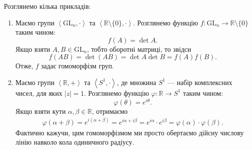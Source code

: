 \documentclass{math_library}
\begin{document}
\begin{example}
Розглянемо кілька прикладів:
\begin{enumerate}[nosep, wide=0pt,label={\arabic*)}]
\item Маємо групи $\left<\mathrm{GL}_n,\cdot \right>$ та $\left<\mathbb{R} \setminus \{0\}, \cdot \right>$. Розглянемо функцію $f \colon \mathrm{GL}_n \to \mathbb{R} \setminus \{0\}$ таким чином:
\[ f(A) = \det A.\]
Якщо взяти $A,B \in \mathrm{GL}_n$, тобто оборотні матриці, то звідси
\[ 
f(AB) = \det (AB) = \det A \det B = f(A) f(B). 
\]
Отже, $f$ задає гомоморфізм груп.

\item Маємо групи $\left<\mathbb{R},+ \right>$ та $\left<S^1, \cdot \right>$, де множина $S^1$ --- набір комплексних чисел, для яких $|z| = 1$. Розглянемо функцію $\varphi \colon \mathbb{R} \to S^1$ таким чином:
\[ 
\varphi(\theta) = e^{i \theta}. 
\]
Якщо взяти кути $\alpha,\beta \in \mathbb{R}$, отримаємо
\begin{align*}
\varphi(\alpha+\beta) = e^{i (\alpha+\beta)} = e^{i \alpha + i \beta} = e^{i\alpha} \cdot e^{i \beta} = \varphi(\alpha) \cdot \varphi(\beta).
\end{align*}
Фактично кажучи, цим гомоморфізмом ми просто обертаємо дійсну числову лінію навколо кола одиничного радіусу.
\begin{figure}[H]
\centering
{}
\qquad
{}
\end{figure}
\end{enumerate}
\end{example}
\end{document}
